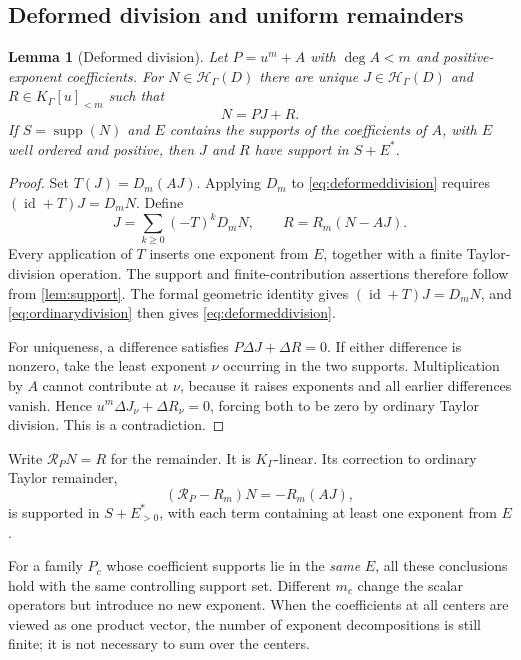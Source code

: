 \documentclass[11pt,letterpaper]{article}
\newtheorem{lemma}[theorem]{Lemma}
\theoremstyle{definition}
\theoremstyle{remark}
\newcommand{\HH}{\mathscr H_\Gamma}
\newcommand{\KG}{K_\Gamma}
\newcommand{\supp}{\operatorname{supp}}
\newcommand{\id}{\operatorname{id}}
\newcommand{\jet}{\mathcal R}
\numberwithin{equation}{section}
\begin{document}
\subsection{Deformed division and uniform remainders}
\begin{lemma}[Deformed division]\label{lem:division}
Let $P=u^m+A$ with $\deg A<m$ and positive-exponent coefficients. For $N\in\HH(D)$ there are unique $J\in\HH(D)$ and $R\in\KG[u]_{<m}$ such that
\begin{equation}\label{eq:deformeddivision}
 N=PJ+R.
\end{equation}
If $S=\supp(N)$ and $E$ contains the supports of the coefficients of $A$, with $E$ well ordered and positive, then $J$ and $R$ have support in $S+E^*$.
\end{lemma}
\begin{proof}
Set $T(J)=D_m(AJ)$. Applying $D_m$ to \eqref{eq:deformeddivision} requires $(\id+T)J=D_mN$. Define
\begin{equation}\label{eq:divisioninverse}
 J=\sum_{k\ge0}(-T)^kD_mN,
 \qquad R=R_m(N-AJ).
\end{equation}
Every application of $T$ inserts one exponent from $E$, together with a finite Taylor-division operation. The support and finite-contribution assertions therefore follow from \cref{lem:support}. The formal geometric identity gives $(\id+T)J=D_mN$, and \eqref{eq:ordinarydivision} then gives \eqref{eq:deformeddivision}.

For uniqueness, a difference satisfies $P\Delta J+\Delta R=0$. If either difference is nonzero, take the least exponent $\nu$ occurring in the two supports. Multiplication by $A$ cannot contribute at $\nu$, because it raises exponents and all earlier differences vanish. Hence $u^m\Delta J_\nu+\Delta R_\nu=0$, forcing both to be zero by ordinary Taylor division. This is a contradiction.
\end{proof}
Write $\jet_PN=R$ for the remainder. It is $\KG$-linear. Its correction to ordinary Taylor remainder,
\begin{equation}\label{eq:remaindercorrection}
 (\jet_P-R_m)N=-R_m(AJ),
\end{equation}
is supported in $S+E^*_{>0}$, with each term containing at least one exponent from $E$.

For a family $P_c$ whose coefficient supports lie in the \emph{same} $E$, all these conclusions hold with the same controlling support set. Different $m_c$ change the scalar operators but introduce no new exponent. When the coefficients at all centers are viewed as one product vector, the number of exponent decompositions is still finite; it is not necessary to sum over the centers.
\end{document}
